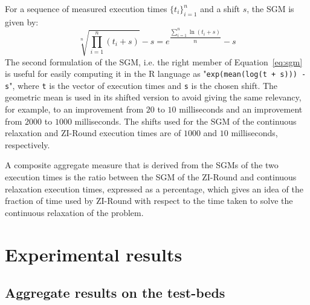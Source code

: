 \documentclass[a4paper,12pt,twoside]{scrbook}
\begin{document}
For a sequence of measured execution times $\{t_i\}_{i=1}^{n}$ and a shift $s$, the SGM is given by:
\begin{equation}\label{eq:sgm}
	\sqrt[n]{\prod_{i=1}^{n}(t_i+s)} - s = e^{\dfrac{\sum_{i=1}^{n}\ln(t_i+s)}{n}}-s
\end{equation}
The second formulation of the SGM, i.e. the right member of Equation~\ref{eq:sgm} is useful for easily computing it in the R language as "\texttt{exp(mean(log(t + s))) - s}", where \texttt{t} is the vector of execution times and \texttt{s} is the chosen shift.
The geometric mean is used in its shifted version to avoid giving the same relevancy, for example, to an improvement from $20$ to $10$ milliseconds and an improvement from $2000$ to $1000$ milliseconds.
The shifts used for the SGM of the continuous relaxation and ZI-Round execution times are of $1000$ and $10$ milliseconds, respectively. \par 

A composite aggregate measure that is derived from the SGMs of the two execution times is the ratio between the SGM of the ZI-Round and continuous relaxation execution times, expressed as a percentage, which gives an idea of the fraction of time used by ZI-Round with respect to the time taken to solve the continuous relaxation of the problem.

\section{Experimental results} \label{sec:expresults}

\subsection{Aggregate results on the test-beds}
\end{document}
